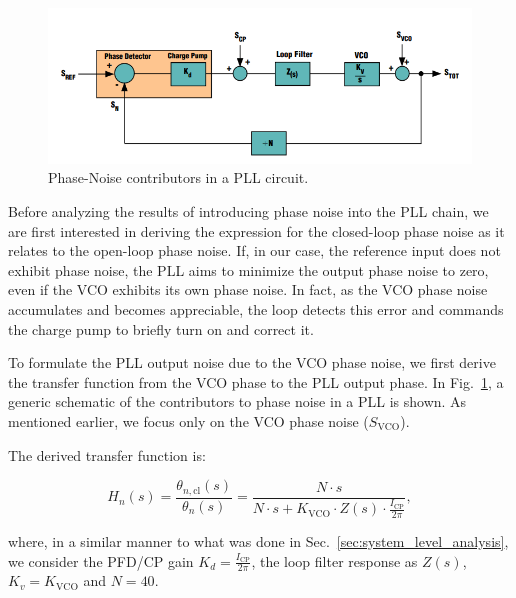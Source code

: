 \documentclass[lettersize,journal]{IEEEtran}
\begin{document}
\begin{figure}[!ht]
    \centering
    \includegraphics[width=1\linewidth]{images/ads_results/phase_noise/phase_noise_block_schematic.png}
    \caption{Phase-Noise contributors in a PLL circuit.}
    \label{fig:phase_noise_block_schematic}
\end{figure}

Before analyzing the results of introducing phase noise into the PLL chain, we are first interested in deriving the expression for the closed-loop phase noise as it relates to the open-loop phase noise. If, in our case, the reference input does not exhibit phase noise, the PLL aims to minimize the output phase noise to zero, even if the VCO exhibits its own phase noise. In fact, as the VCO phase noise accumulates and becomes appreciable, the loop detects this error and commands the charge pump to briefly turn on and correct it.

To formulate the PLL output noise due to the VCO phase noise, we first derive the transfer function from the VCO phase to the PLL output phase. In Fig.~\ref{fig:phase_noise_block_schematic}, a generic schematic of the contributors to phase noise in a PLL is shown. As mentioned earlier, we focus only on the VCO phase noise (\(S_{\text{VCO}}\)).

The derived transfer function is:

\[
H_n(s) = \frac{\theta_{n,\text{cl}}(s)}{\theta_n(s)} = \frac{N \cdot s}{N \cdot s + K_{\text{VCO}} \cdot Z(s) \cdot \frac{I_{\text{CP}}}{2\pi}},
\]

where, in a similar manner to what was done in Sec.~\ref{sec:system_level_analysis}, we consider the PFD/CP gain \(K_d = \frac{I_{\text{CP}}}{2\pi}\), the loop filter response as \(Z(s)\), \(K_v = K_{\text{VCO}}\) and \(N = 40\).
\end{document}
